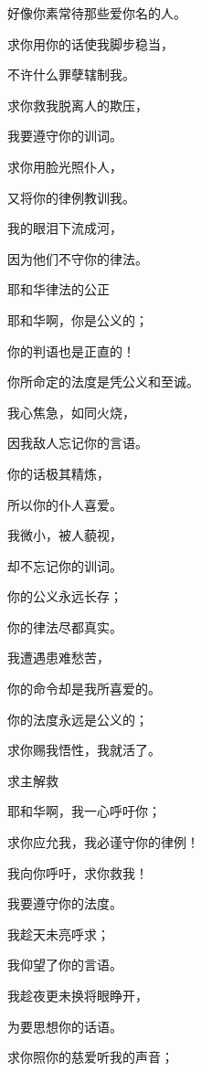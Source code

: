 {\par }{\Q 好像你素常待那些爱你名的人。
\par }{\Q {}求你用你的话使我脚步稳当，
\par }{\Q 不许什么罪孽辖制我。
\par }{\Q {}求你救我脱离人的欺压，
\par }{\Q 我要遵守你的训词。
\par }{\Q {}求你用脸光照仆人，
\par }{\Q 又将你的律例教训我。
\par }{\Q {}我的眼泪下流成河，
\par }{\Q 因为他们不守你的律法。
\par }{\SH 耶和华律法的公正
\par }{\Q {}耶和华啊，你是公义的；
\par }{\Q 你的判语也是正直的！
\par }{\Q {}你所命定的法度是凭公义和至诚。
\par }{\Q {}我心焦急，如同火烧，
\par }{\Q 因我敌人忘记你的言语。
\par }{\Q {}你的话极其精炼，
\par }{\Q 所以你的仆人喜爱。
\par }{\Q {}我微小，被人藐视，
\par }{\Q 却不忘记你的训词。
\par }{\Q {}你的公义永远长存；
\par }{\Q 你的律法尽都真实。
\par }{\Q {}我遭遇患难愁苦，
\par }{\Q 你的命令却是我所喜爱的。
\par }{\Q {}你的法度永远是公义的；
\par }{\Q 求你赐我悟性，我就活了。
\par }{\SH 求主解救
\par }{\Q {}耶和华啊，我一心呼吁你；
\par }{\Q 求你应允我，我必谨守你的律例！
\par }{\Q {}我向你呼吁，求你救我！
\par }{\Q 我要遵守你的法度。
\par }{\Q {}我趁天未亮呼求；
\par }{\Q 我仰望了你的言语。
\par }{\Q {}我趁夜更未换将眼睁开，
\par }{\Q 为要思想你的话语。
\par }{\Q {}求你照你的慈爱听我的声音；
}
